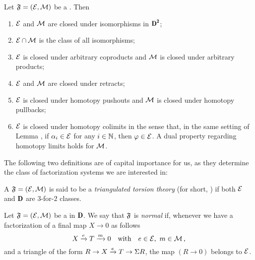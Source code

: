 \begin{proposition}\label{closure_phfs}
Let $\mathfrak{F}=(\mathcal{E},\mathcal{M})$ be a \phfs. Then 
\begin{enumerate}
\item $\mathcal{E}$ and $\mathcal{M}$ are closed under isomorphisms in $\cD^\due $;
\item $\mathcal{E}\cap \mathcal{M}$ is the class of all isomorphisms;
\item $\mathcal{E}$ is closed under arbitrary coproducts and $\mathcal{M}$ is closed under arbitrary products;
\item $\mathcal{E}$ and $\mathcal{M}$ are closed under retracts;
\item $\mathcal{E}$ is closed under homotopy pushouts and $\mathcal{M}$ is closed under homotopy pullbacks;
\item $\mathcal{E}$ is closed under homotopy colimits in the sense that, in the same setting of Lemma , if $\alpha_i\in \mathcal{E}$ for any $i\in \mathbb{N}$, then $\varphi\in \mathcal{E}$. A dual property regarding homotopy limits holds for $\mathcal{M}$.
\end{enumerate}
\end{proposition}
The following two definitions are of capital importance for us, as they determine the class of factorization systems we are interested in:
\begin{definition}\label{hott}
A \hfs $\mathfrak{F}=(\mathcal{E},\mathcal{M})$ is said to be a \emph{triangulated torsion theory} (for short, \htth%
) if both $\mathcal{E}$ and $\cD$ are $3$-for-$2$ classes.
\end{definition}
\begin{definition}\label{hontt}
Let $\mathfrak{F}=(\mathcal{E},\mathcal{M})$ be a \hfs in $\cD$. We say that $\mathfrak{F}$ is \emph{normal} if, whenever we have a factorization of a final map $X\to 0$ as follows
\[
X \xrightarrow{e} T \xrightarrow{m}  0\ \ \text{ with }\ \ e\in \mathcal{E},\ m\in \mathcal{M}\,,
\] and a triangle of the form $R\to X \xrightarrow{e} T\to \Sigma R$, the map $(R\to 0)$ belongs to $\mathcal{E}$.
\end{definition}